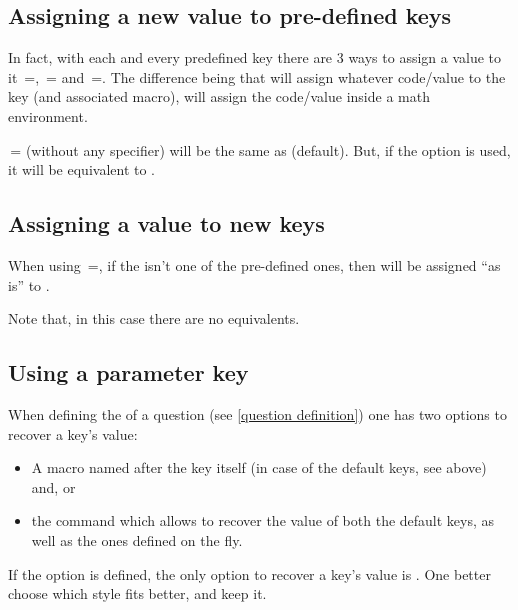 \documentclass[10pt]{article}
\begin{document}
\subsection{Assigning a new value to pre-defined keys}
In fact, with each and every predefined key there are 3 ways to assign a value to it \,=, \,= and \,=. The difference being that  will assign whatever code/value to the key (and associated macro),  will assign the code/value inside a math environment. 
\begin{tsremark}
\,= (without any specifier) will be the same as  (default). But, if the option  is used, it will be equivalent to .
\end{tsremark}

\subsection{Assigning a value to new keys}
When using  \,=, if the  isn't one of the pre-defined ones, then  will be assigned ``as is'' to .
\begin{tsremark}
Note that, in this case there are no  equivalents. 
\end{tsremark}

\subsection{Using a parameter key}
When defining the  of a question (see \ref{question definition}) one has two options to recover a key's value:
\begin{itemize}
  \item A macro named after the key itself (in case of the default keys, see above) and, or
  \item the \tsobj{\QuestVal} command which allows to recover the value of both the default keys, as well as the ones defined on the fly.
\end{itemize}
\begin{tsremark}
If the option  is defined, the only option to recover a key's value is \tsobj{\QuestVal}. One better choose which style fits better, and keep it.
\end{tsremark}
\end{document}
